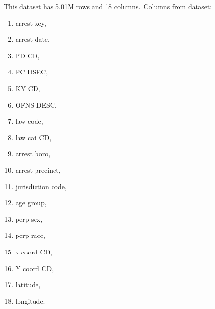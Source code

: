 \documentclass{article}\usepackage[]{graphicx}\usepackage[]{color}
\begin{document}
        This dataset has 5.01M rows and 18 columns.\
        Columns from dataset:
        \begin{enumerate}
          \item arrest key,
          \item arrest date,
          \item PD CD,
          \item PC DSEC,
          \item KY CD,
          \item OFNS DESC,
          \item law code,
          \item law cat CD,
          \item arrest boro,
          \item arrest precinct,
          \item jurisdiction code,
          \item age group,
          \item perp sex,
          \item perp race,
          \item x coord CD,
          \item Y coord CD,
          \item latitude,
          \item longitude.
        \end{enumerate}

  \maketitle 
     \newpage   
\end{document}
